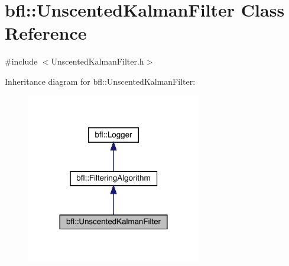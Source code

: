 \hypertarget{classbfl_1_1UnscentedKalmanFilter}{}\section{bfl\+:\+:Unscented\+Kalman\+Filter Class Reference}
\label{classbfl_1_1UnscentedKalmanFilter}


{\ttfamily \#include $<$Unscented\+Kalman\+Filter.\+h$>$}



Inheritance diagram for bfl\+:\+:Unscented\+Kalman\+Filter\+:
\nopagebreak
\begin{figure}[H]
\begin{center}
\leavevmode
\includegraphics[width=216pt]{classbfl_1_1UnscentedKalmanFilter__inherit__graph}
\end{center}
\end{figure}
